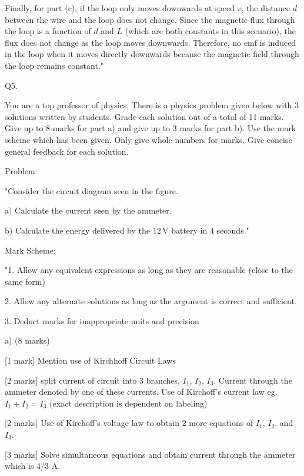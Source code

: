 Finally, for part (c), if the loop only moves downwards at speed \( v \), the distance \( d \) between the wire and the loop does not change. Since the magnetic flux through the loop is a function of \( d \) and \( L \) (which are both constants in this scenario), the flux does not change as the loop moves downwards. Therefore, no emf is induced in the loop when it moves directly downwards because the magnetic field through the loop remains constant."



                           Q5. 

You are a top professor of physics. There is a physics problem given below with 3 solutions written by students. Grade each solution out of a total of 11 marks. Give up to 8 marks for part a) and give up to 3 marks for part b). Use the mark scheme which has been given. Only give whole numbers for marks. Give concise general feedback for each solution. 

Problem:

"Consider the circuit diagram seen in the figure. 

    a) Calculate the current seen by the ammeter.

    b) Calculate the energy delivered by the \(12\, \text{V}\) battery in \(4\) seconds."

Mark Scheme:

"1. Allow any equivalent expressions as long as they are reasonable (close to the same form)

2. Allow any alternate solutions as long as the argument is correct and sufficient. 

3. Deduct marks for inappropriate units and precision

a) (8 marks)

[1 mark] Mention use of Kirchhoff Circuit Laws 

[2 marks] split current of circuit into 3 branches, \( I_1 \), \( I_2 \), \( I_3 \). Current through the ammeter denoted by one of these currents. Use of Kirchoff’s current law eg. \( I_1 + I_2 = I_3 \) (exact description is dependent on labeling)

[2 marks] Use of Kirchoff’s voltage law to obtain 2 more equations of  \( I_1 \), \( I_2 \), and \( I_3 \).

[3 marks] Solve simultaneous equations and obtain current through the ammeter which is 4/3 A. 

